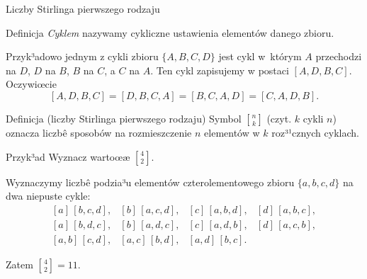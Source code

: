 \documentclass[a4paper,10pt]{beamer}
\begin{document}
\begin{frame}{Liczby Stirlinga pierwszego rodzaju}

\begin{block}{Definicja}
{\it Cyklem} nazywamy cykliczne ustawienia elementów danego zbioru.
\end{block}

\bigskip

\begin{minipage}{0.75\textwidth}
Przyk³adowo jednym z cykli zbioru $\{A,B,C,D\}$ jest cykl w~którym $A$ przechodzi na $D$, $D$ na $B$, $B$ na $C$, a $C$ na $A$. Ten cykl zapisujemy w postaci $[A,D,B,C]$. Oczywiœcie
$$[A,D,B,C]=[D,B,C,A]=[B,C,A,D]=[C,A,D,B].$$
\end{minipage}
\hfill
\begin{minipage}{0.2\textwidth}
\end{minipage}

\begin{block}{Definicja (liczby Stirlinga pierwszego rodzaju)}
Symbol ${n\brack k}$ (czyt. $k$ cykli $n$) oznacza liczbê sposobów na rozmieszczenie $n$ elementów w $k$ roz³¹cznych cyklach.
\end{block}
\end{frame}


\begin{frame}
\begin{exampleblock}{Przyk³ad}
Wyznacz wartoœæ ${4\brack2}$.

\smallskip

Wyznaczymy liczbê podzia³u elementów czterolementowego zbioru $\{a,b,c,d\}$ na dwa niepuste cykle:
$$\begin{array}{cccc}
[a]\,[b,c,d],&[b]\,[a,c,d],&[c]\,[a,b,d],&[d]\,[a,b,c],\\{}
[a]\,[b,d,c],&[b]\,[a,d,c],&[c]\,[a,d,b],&[d]\,[a,c,b],\\{}
[a,b]\,[c,d],&[a,c]\,[b,d],&[a,d]\,[b,c].
\end{array}$$

Zatem ${4\brack2}=11$.
\end{exampleblock}
\end{frame}
\end{document}
